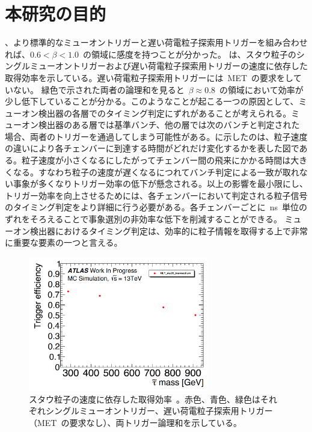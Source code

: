 \section{本研究の目的}
、より標準的なミューオントリガーと遅い荷電粒子探索用トリガーを組み合わせれば、$0.6<\beta<1.0$~の領域に感度を持つことが分かった。
は、スタウ粒子のシングルミューオントリガーおよび遅い荷電粒子探索用トリガーの速度に依存した取得効率を示している。遅い荷電粒子探索用トリガーには~MET~の要求をしていない。
緑色で示された両者の論理和を見ると~$\beta\approx0.8$~の領域において効率が少し低下していることが分かる。このようなことが起こる一つの原因として、ミューオン検出器の各層でのタイミング判定にずれがあることが考えられる。ミューオン検出器のある層では基準バンチ、他の層では次のバンチと判定された場合、両者のトリガーを通過してしまう可能性がある。に示したのは、粒子速度の違いにより各チェンバーに到達する時間がどれだけ変化するかを表した図である。粒子速度が小さくなるにしたがってチェンバー間の飛来にかかる時間は大きくなる。すなわち粒子の速度が遅くなるにつれてバンチ判定による一致が取れない事象が多くなりトリガー効率の低下が懸念される。以上の影響を最小限にし、トリガー効率を向上させるためには、各チェンバーにおいて判定される粒子信号のタイミング判定をより詳細に行う必要がある。各チェンバーごとに~ns~単位のずれをそろえることで事象選別の非効率な低下を削減することができる。
ミューオン検出器におけるタイミング判定は、効率的に粒子情報を取得する上で非常に重要な要素の一つと言える。
\begin{figure}[H]
        \centering   
        \includegraphics[width=0.7\textwidth,page=4]{img/pdf3/sumi.pdf}
        \caption[スタウ粒子の速度に依存した取得効率]{スタウ粒子の速度に依存した取得効率~\cite{MT:01}。赤色、青色、緑色はそれぞれシングルミューオントリガー、遅い荷電粒子探索用トリガー（MET~の要求なし）、両トリガー論理和を示している。}
        \label{fig:sumi4}
\end{figure}
